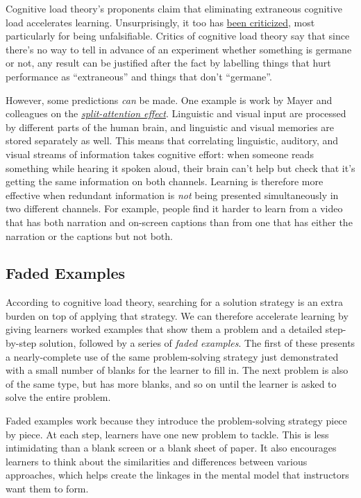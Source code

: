 Cognitive load theory's proponents claim that eliminating extraneous
cognitive load accelerates learning. Unsurprisingly, it too has
\href{https://edtechdev.wordpress.com/2009/11/16/cognitive-load-theory-failure/}{been
criticized}, most particularly for being unfalsifiable. Critics of
cognitive load theory say that since there's no way to tell in advance
of an experiment whether something is germane or not, any result can be
justified after the fact by labelling things that hurt performance as
``extraneous'' and things that don't ``germane''.

However, some predictions \emph{can} be made. One example is work by
Mayer and colleagues on the
\emph{\href{https://en.wikipedia.org/wiki/Split\_attention\_effect}{split-attention
effect}}. Linguistic and visual input are processed by different parts
of the human brain, and linguistic and visual memories are stored
separately as well. This means that correlating linguistic, auditory,
and visual streams of information takes cognitive effort: when someone
reads something while hearing it spoken aloud, their brain can't help
but check that it's getting the same information on both channels.
Learning is therefore more effective when redundant information is
\emph{not} being presented simultaneously in two different channels. For
example, people find it harder to learn from a video that has both
narration and on-screen captions than from one that has either the
narration or the captions but not both.

\subsection{Faded Examples}\label{faded-examples}

According to cognitive load theory, searching for a solution strategy is
an extra burden on top of applying that strategy. We can therefore
accelerate learning by giving learners worked examples that show them a
problem and a detailed step-by-step solution, followed by a series of
\emph{faded examples}. The first of these presents a nearly-complete use
of the same problem-solving strategy just demonstrated with a small
number of blanks for the learner to fill in. The next problem is also of
the same type, but has more blanks, and so on until the learner is asked
to solve the entire problem.

Faded examples work because they introduce the problem-solving strategy
piece by piece. At each step, learners have one new problem to tackle.
This is less intimidating than a blank screen or a blank sheet of paper.
It also encourages learners to think about the similarities and
differences between various approaches, which helps create the linkages
in the mental model that instructors want them to form.

